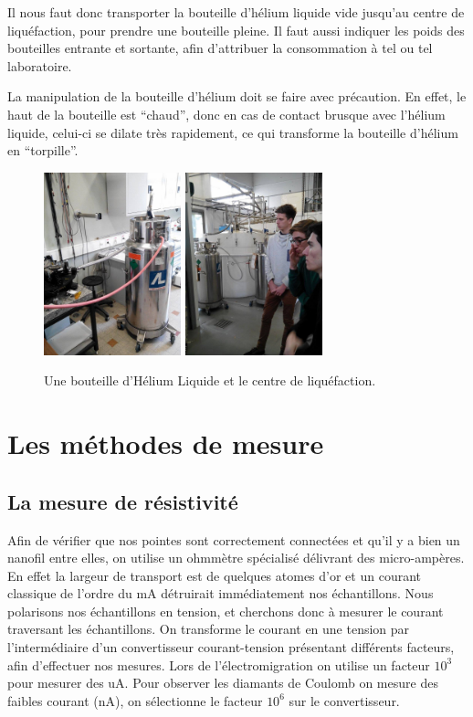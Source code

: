 Il nous faut donc transporter la bouteille d'hélium liquide vide jusqu'au centre de liquéfaction, pour prendre une bouteille pleine. Il faut aussi indiquer les poids des bouteilles entrante et sortante, afin d'attribuer la consommation à tel ou tel laboratoire.

La manipulation de la bouteille d'hélium doit se faire avec précaution. En effet, le haut de la bouteille est “chaud”, donc en cas de contact brusque avec l'hélium liquide, celui-ci se dilate très rapidement, ce qui transforme la bouteille d'hélium en “torpille”.
\begin{figure}[h]
    \begin{center}
        \includegraphics[width=150px]{Photos/Bouteille_Helium_Liquide.jpg}
        \includegraphics[width=150px]{Photos/Centre_Helium_Liquide.jpg}
        \caption{Une bouteille d'Hélium Liquide et le centre de liquéfaction.}
        \label{fig:}
    \end{center}
\end{figure}

\section{Les méthodes de mesure}
\subsection{La mesure de résistivité}
Afin de vérifier que nos pointes sont correctement connectées et qu'il y a bien un nanofil entre elles, on utilise un ohmmètre spécialisé délivrant des micro-ampères. En effet la largeur de transport est de quelques atomes d'or et un courant classique de l'ordre du mA détruirait immédiatement nos échantillons.
Nous polarisons nos échantillons en tension, et cherchons donc à mesurer le courant traversant les échantillons.
On transforme le courant en une tension par l'intermédiaire d'un convertisseur courant-tension présentant différents facteurs, afin d'effectuer nos mesures. Lors de l'électromigration on utilise un facteur $10^3$ pour mesurer des uA.
Pour observer les diamants de Coulomb on mesure des faibles courant (nA), on sélectionne le facteur $10^6$ sur le convertisseur. 

